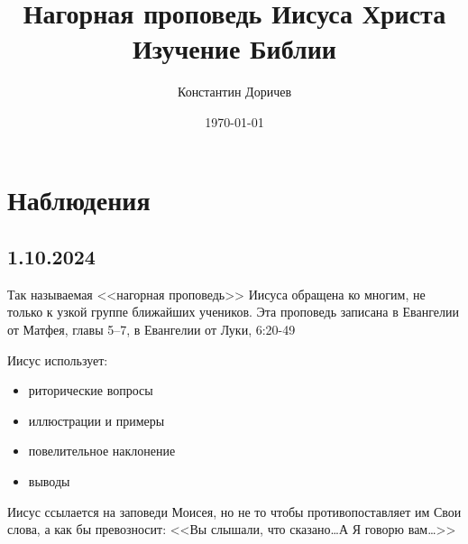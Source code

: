 \documentclass[12pt,article,a4paper,fittopage,oneside]{article}
\title{Нагорная проповедь Иисуса Христа\\Изучение Библии}
\author{Константин Доричев}
\date{\today}
\begin{document}
\maketitle
\tableofcontents

\section*{Наблюдения}

\subsection*{1.10.2024}

Так называемая <<нагорная проповедь>> Иисуса обращена ко многим, не только к узкой группе ближайших учеников. Эта проповедь записана в Евангелии от Матфея, главы 5--7, в Евангелии от Луки, 6:20-49

Иисус использует:
\begin{itemize}
    \item риторические вопросы
    \item иллюстрации и примеры
    \item повелительное наклонение
    \item выводы
\end{itemize}


Иисус ссылается на заповеди Моисея, но не то чтобы противопоставляет им Свои слова, а как бы превозносит: <<Вы слышали, что сказано\ldots А Я говорю вам\ldots>>

	
\end{document}
